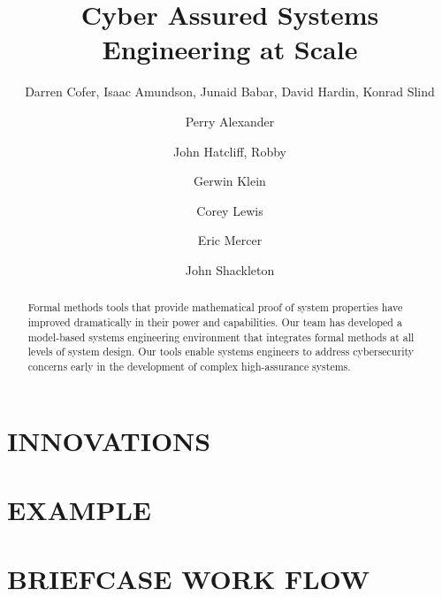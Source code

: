 \documentclass{IEEEcsmag}
\begin{document}

\title{Cyber Assured Systems Engineering at Scale}

\author{Darren Cofer, Isaac Amundson, Junaid Babar, David Hardin, Konrad Slind}

\author{Perry Alexander}

\author{John Hatcliff, Robby}

\author{Gerwin Klein}

\author{Corey Lewis}

\author{Eric Mercer}

\author{John Shackleton}


\begin{abstract}
Formal methods tools that provide mathematical proof of system properties
have improved dramatically in their power and capabilities. Our team has developed a model-based systems
engineering environment that integrates formal methods at all levels of system design.
Our tools enable systems engineers to address
cybersecurity concerns early in the development of complex high-assurance systems.
\end{abstract}

\maketitle




\section{INNOVATIONS}


\section{EXAMPLE}


\section{BRIEFCASE WORK FLOW}

\end{document}
